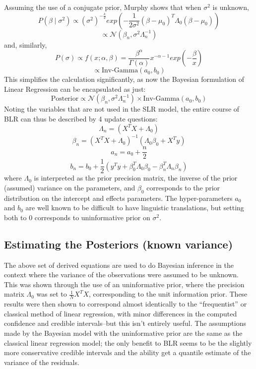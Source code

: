 \documentclass[10pt]{article}
\begin{document}
Assuming the use of a conjugate prior, Murphy \cite{murphy2012machine} shows that when $\sigma^2$ is unknown, 
$$ P(\beta \mid \sigma^2) \propto (\sigma^2)^{-\frac{k}{2}} exp(-\frac{1}{2 \sigma^2}(\beta - \mu_0)^T \Lambda_0 (\beta - \mu_0))$$
$$ \propto \mathcal{N}(\beta_n, \sigma^2 \Lambda_n^{-1})$$
and, similarly, 
$$ P(\sigma) \propto f(x; \alpha, \beta) = \frac{\beta^{\alpha}}{\Gamma{(\alpha)}}x^{-\alpha - 1} exp(-\frac{\beta}{x})$$
$$ \propto \text{Inv-Gamma}(a_0, b_0)$$
This simplifies the calculation significantly, as now the Bayesian formulation of Linear Regression can be encapsulated as just: 
$$ \text{Posterior} \propto \mathcal{N}(\beta_n, \sigma^2 \Lambda_n^{-1}) \times \text{Inv-Gamma}(a_0, b_0) $$
Noting the variables that are not used in the SLR model, the entire course of BLR can thus be described by 4 update questions: 
$$ \Lambda_n = (X^{T} X + \Lambda_0) $$
$$ \beta_n =  (X^T X + \Lambda_0)^{-1} (\Lambda_0 \beta_0 + X^T y) $$
$$ a_n = a_0 + \frac{n}{2} $$
$$ b_n = b_0 + \frac{1}{2}(y^T y + \beta_0^T \Lambda_0 \beta_0 - \beta_n^T \Lambda_n \beta_n ) $$
where $\Lambda_0$ is interpreted as the prior precision matrix, the inverse of the prior (assumed) variance on the parameters, and $\beta_0$ corresponds to the prior distribution on the intercept and effects parameters. The hyper-parameters $a_0$ and $b_0$ are well known to be difficult to have linguistic translations, but setting both to 0 corresponds to uninformative prior on $\sigma^2$. 

\subsection{Estimating the Posteriors (known variance)}
The above set of derived equations are used to do Bayesian inference in the context where the variance of the observations were assumed to be unknown. This was shown through the use of an uninformative prior, where the precision matrix $\Lambda_0$ was set to $\frac{1}{N} X^{T} X$, corresponding to the unit information prior\cite{kass1995reference}. These results were then shown to correspond almost identically to the ``frequentist'' or classical method of linear regression, with minor differences in the computed confidence and credible intervals--but this isn't entirely useful. The assumptions made by the Bayesian model with the uninformative prior are the same as the classical linear regression model; the only benefit to BLR seems to be the slightly more conservative credible intervals and the ability get a quantile estimate of the variance of the residuals. 
\end{document}
